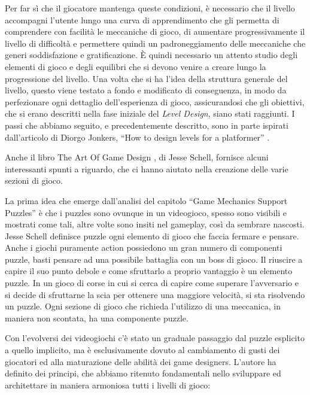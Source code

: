 Per far sì che il giocatore mantenga queste condizioni, è necessario che il livello accompagni l’utente lungo una curva di apprendimento che gli permetta di comprendere con facilità le meccaniche di gioco, di aumentare progressivamente il livello di difficoltà e permettere quindi un padroneggiamento delle meccaniche che generi soddisfazione e gratificazione.
È quindi necessario un attento studio degli elementi di gioco e degli equilibri che si devono venire a creare lungo la progressione del livello.
Una volta che si ha l’idea della struttura generale del livello, questo viene testato a fondo e modificato di conseguenza, in modo da perfezionare ogni dettaglio dell’esperienza di gioco, assicurandosi che gli obiettivi, che si erano descritti nella fase iniziale del \textit{Level Design}, siano stati raggiunti.
I passi che abbiamo seguito, e precedentemente descritto, sono in parte ispirati dall’articolo di Diorgo Jonkers, “How to design levels for a platformer” \cite{DiorgoJonkersArticle}.

Anche il libro The Art Of Game Design \cite{artOfGameDesign}, di Jesse Schell, fornisce alcuni interessanti spunti a riguardo, che ci hanno aiutato nella creazione delle varie sezioni di gioco.

La prima idea che emerge dall’analisi del capitolo “Game Mechanics Support Puzzles” è che i puzzles sono ovunque in un videogioco, spesso sono visibili e mostrati come tali, altre volte sono insiti nel gameplay, così da sembrare nascosti. Jesse Schell definisce puzzle ogni elemento di gioco che faccia fermare e pensare. Anche i giochi puramente action possiedono un gran numero di componenti puzzle, basti pensare ad una possibile battaglia con un boss di gioco. Il riuscire a capire il suo punto debole e come sfruttarlo a proprio vantaggio è un elemento puzzle. In un gioco di corse in cui si cerca di capire come superare l’avversario e si decide di sfruttarne la scia per ottenere una maggiore velocità, si sta risolvendo un puzzle. Ogni sezione di gioco che richieda l’utilizzo di una meccanica, in maniera non scontata, ha una componente puzzle.

Con l’evolversi dei videogiochi c’è stato un graduale passaggio dal puzzle esplicito a quello implicito, ma è esclusivamente dovuto al cambiamento di gusti dei giocatori ed alla maturazione delle abilità dei game designers.
L’autore ha definito dei principi, che abbiamo ritenuto fondamentali nello sviluppare ed architettare in maniera armoniosa tutti i livelli di gioco:

